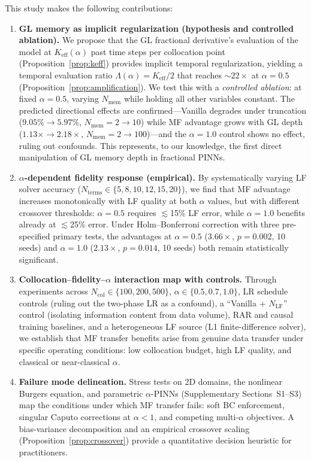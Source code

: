 \documentclass[preprint,12pt]{elsarticle}
\newcommand{\Ncol}{N_{\mathrm{col}}}
\newcommand{\NLF}{N_{\mathrm{LF}}}
\begin{document}
This study makes the following contributions:
\begin{enumerate}
    \item \textbf{GL memory as implicit regularization (hypothesis and controlled ablation).} We propose that the GL fractional derivative's evaluation of the model at $K_{\mathrm{eff}}(\alpha)$ past time steps per collocation point (Proposition~\ref{prop:keff}) provides implicit temporal regularization, yielding a temporal evaluation ratio $\Lambda(\alpha) = K_{\mathrm{eff}}/2$ that reaches ${\sim}22\times$ at $\alpha = 0.5$ (Proposition~\ref{prop:amplification}). We test this with a \emph{controlled ablation}: at fixed $\alpha = 0.5$, varying $N_{\mathrm{mem}}$ while holding all other variables constant. The predicted directional effects are confirmed---Vanilla degrades under truncation ($9.05\% \to 5.97\%$, $N_{\mathrm{mem}} = 2 \to 10$) while MF advantage grows with GL depth ($1.13\times \to 2.18\times$, $N_{\mathrm{mem}} = 2 \to 100$)---and the $\alpha = 1.0$ control shows no effect, ruling out confounds. This represents, to our knowledge, the first direct manipulation of GL memory depth in fractional PINNs.

    \item \textbf{$\alpha$-dependent fidelity response (empirical).} By systematically varying LF solver accuracy ($N_{\mathrm{terms}} \in \{5, 8, 10, 12, 15, 20\}$), we find that MF advantage increases monotonically with LF quality at both $\alpha$ values, but with different crossover thresholds: $\alpha = 0.5$ requires $\lesssim$15\% LF error, while $\alpha = 1.0$ benefits already at $\lesssim$25\% error. Under Holm--Bonferroni correction with three pre-specified primary tests, the advantages at $\alpha = 0.5$ ($3.66\times$, $p = 0.002$, 10 seeds) and $\alpha = 1.0$ ($2.13\times$, $p = 0.014$, 10 seeds) both remain statistically significant.

    \item \textbf{Collocation--fidelity--$\alpha$ interaction map with controls.} Through experiments across $\Ncol \in \{100, 200, 500\}$, $\alpha \in \{0.5, 0.7, 1.0\}$, LR schedule controls (ruling out the two-phase LR as a confound), a ``Vanilla + $\NLF$'' control (isolating information content from data volume), RAR and causal training baselines, and a heterogeneous LF source (L1 finite-difference solver), we establish that MF transfer benefits arise from genuine data transfer under specific operating conditions: low collocation budget, high LF quality, and classical or near-classical $\alpha$.

    \item \textbf{Failure mode delineation.} Stress tests on 2D domains, the nonlinear Burgers equation, and parametric $\alpha$-PINNs (Supplementary Sections~S1--S3) map the conditions under which MF transfer fails: soft BC enforcement, singular Caputo corrections at $\alpha < 1$, and competing multi-$\alpha$ objectives. A bias-variance decomposition and an empirical crossover scaling (Proposition~\ref{prop:crossover}) provide a quantitative decision heuristic for practitioners.
\end{enumerate}
\end{document}
